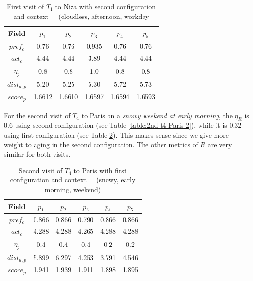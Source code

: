 \begin{table}[h!]
\vspace{-0.1cm}
\footnotesize{
    \centering
        \caption{First visit of $T_1$ to Niza with second configuration and context = (cloudless,  afternoon, workday}
    \label{table:2nd-t1-niza-1}
    \vspace{-0.3cm}
    \begin{tabular}{ |c|c|c|c|c|c| } 
        \hline
        Field   & $p_1$ & $p_2$ & $p_3$ & $p_4$ & $p_5$ \\
        \hline
        $pref_c$    &  0.76 & 0.76 & 0.935 & 0.76 & 0.76 \\
        $act_c$     & 4.44 & 4.44 & 3.89 & 4.44 & 4.44  \\
        $\eta_p$    & 0.8 & 0.8 & 1.0 & 0.8 & 0.8 \\
        $dist_{u,p}$ & 5.20 & 5.25 & 5.30 & 5.72 & 5.73 \\
        $score_p$    & 1.6612 & 1.6610 & 1.6597 & 1.6594 & 1.6593 \\
        
        \hline
    \end{tabular}
    }
    \vspace{-0.2cm}
\end{table}

For the second visit of $T_4$ to Paris on a {\it snowy weekend at early morning}, the $\eta_R$ is $0.6$ using second configuration (see Table \ref{table:2nd-t4-Paris-2}), while it is $0.32$ using first configuration (see Table \ref{table:1st-t4-Paris-2}). This makes sense since we give more weight to aging in the second configuration. The other metrics of $R$ are very similar for both visits.

\begin{table}[h!]
\vspace{-0.1cm}
\footnotesize{
    \centering
        \caption{Second visit of $T_4$ to Paris with first configuration and context = (snowy, early morning, weekend)}
    \label{table:1st-t4-Paris-2}
    \vspace{-0.3cm}
    \begin{tabular}{ |c|c|c|c|c|c| } 
        \hline
        Field   & $p_1$ & $p_2$ & $p_3$ & $p_4$ & $p_5$ \\
        \hline
        $pref_c$    &  0.866 & 0.866 & 0.790 & 0.866 & 0.866 \\
        $act_c$     & 4.288 & 4.288 & 4.265 & 4.288 & 4.288  \\
        $\eta_p$    & 0.4 & 0.4 & 0.4 & 0.2 & 0.2 \\
        $dist_{u,p}$ & 5.899 & 6.297 & 4.253 & 3.791 & 4.546 \\
        $score_p$    & 1.941 & 1.939 & 1.911 & 1.898 & 1.895 \\
        
        \hline
    \end{tabular}
    }
    \vspace{-0.2cm}
\end{table}

